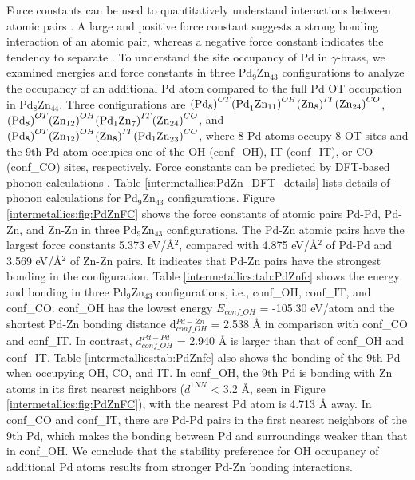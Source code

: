 Force constants can be used to quantitatively understand interactions between atomic pairs \cite{shang2009first}. A large and positive force constant suggests a strong bonding interaction of an atomic pair, whereas a negative force constant indicates the tendency to separate \cite{yu2019synthesis}. To understand the site occupancy of Pd in $\gamma$-brass, we examined energies and force constants in three Pd$_9$Zn$_{43}$ configurations to analyze the occupancy of an additional Pd atom compared to the full Pd OT occupation in Pd$_8$Zn$_{44}$. Three configurations are $({{\rm Pd}_8)}^{OT}{{(\rm Pd}_1{\rm Zn}_{11})}^{OH}({{\rm Zn}_8)}^{IT}({{\rm Zn}_{24})}^{CO}$, \\$({{\rm Pd}_8)}^{OT}{({\rm Zn}_{12})}^{OH}({{{\rm Pd}_1\rm Zn}_7)}^{IT}({{\rm Zn}_{24})}^{CO}$, and $({{\rm Pd}_8)}^{OT}{({\rm Zn}_{12})}^{OH}({{\rm Zn}_8)}^{IT}({{{\rm Pd}_1\rm Zn}_{23})}^{CO}$, where 8 Pd atoms occupy 8 OT sites and the 9th Pd atom occupies one of the OH (conf\_OH), IT (conf\_IT), or CO (conf\_CO) sites, respectively. Force constants can be predicted by DFT-based phonon calculations \cite{shang2018understanding}. Table \ref{intermetallics:PdZn_DFT_details} lists details of phonon calculations for Pd$_9$Zn$_{43}$ configurations. Figure \ref{intermetallics:fig:PdZnFC} shows the force constants of atomic pairs Pd-Pd, Pd-Zn, and Zn-Zn in three Pd$_9$Zn$_{43}$ configurations. The Pd-Zn atomic pairs have the largest force constants 5.373 eV/\r{A}$^2$, compared with 4.875 eV/\r{A}$^2$ of Pd-Pd and 3.569 eV/\r{A}$^2$ of Zn-Zn pairs. It indicates that Pd-Zn pairs have the strongest bonding in the configuration. Table \ref{intermetallics:tab:PdZnfc} shows the energy and bonding in three Pd$_9$Zn$_{43}$ configurations, i.e., conf\_OH, conf\_IT, and conf\_CO. conf\_OH has the lowest energy $E_{conf\_OH}$ = -105.30 eV/atom and the shortest Pd-Zn bonding distance d$_{conf\_OH}^{Pd-Zn}$ = 2.538 \r{A} in comparison with conf\_CO and conf\_IT. In contrast, $d_{conf\_OH}^{Pd-Pd}$ = 2.940 \r{A} is larger than that of conf\_OH and conf\_IT. Table \ref{intermetallics:tab:PdZnfc} also shows the bonding of the 9th Pd when occupying OH, CO, and IT. In conf\_OH, the 9th Pd is bonding with Zn atoms in its first nearest neighbors ($d^{1NN}$ < 3.2 \r{A}, seen in Figure \ref{intermetallics:fig:PdZnFC}), with the nearest Pd atom is 4.713 \r{A} away. In conf\_CO and conf\_IT, there are Pd-Pd pairs in the first nearest neighbors of the 9th Pd, which makes the bonding between Pd and surroundings weaker than that in conf\_OH. We conclude that the stability preference for OH occupancy of additional Pd atoms results from stronger Pd-Zn bonding interactions.

